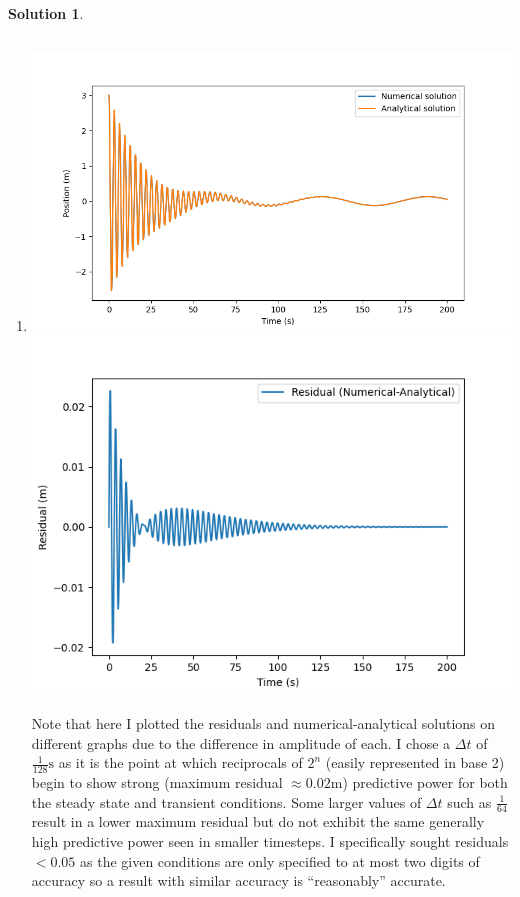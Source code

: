 \documentclass[10pt]{article}
\theoremstyle{definition}
\newtheorem{soln}{Solution}
\begin{document}
\begin{soln}
\begin{enumerate}[label=(\alph*)]
            \item \inputminted[breaklines, autogobble]{python3}{./python/q1/q1g.py}
                  \begin{center}
                        \includegraphics[scale=0.75]{Figure_4.png}
                        \includegraphics[scale=0.75]{Figure_4-1.png}
                  \end{center}
                  Note that here I plotted the residuals and numerical-analytical solutions on different graphs due to the difference
                  in amplitude of each. I chose a $\Delta t$ of $\frac{1}{128}\unit{\second}$ as it is the point at which reciprocals of $2^n$ (easily represented in base 2)
                  begin to show strong (maximum residual $\approx 0.02\unit{\meter}$) predictive power for both the steady state and transient conditions. Some larger values of $\Delta t$
                  such as $\frac{1}{64}$ result in a lower maximum residual but do not exhibit the same generally high predictive power seen in smaller timesteps. I specifically sought 
                  residuals $<0.05$ as the given conditions are only specified to at most two digits of accuracy so a result with similar accuracy is ``reasonably'' accurate.
      \end{enumerate}
\end{soln}
\newpage
\end{document}
